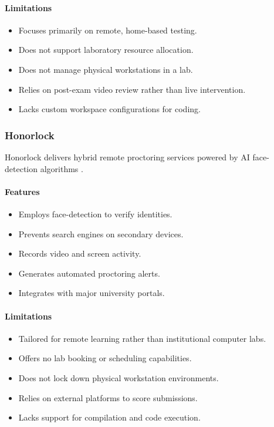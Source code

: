 \paragraph{Limitations}
\begin{itemize}[noitemsep]
\item Focuses primarily on remote, home-based testing.
\item Does not support laboratory resource allocation.
\item Does not manage physical workstations in a lab.
\item Relies on post-exam video review rather than live intervention.
\item Lacks custom workspace configurations for coding.
\end{itemize}

\subsubsection{Honorlock}
Honorlock delivers hybrid remote proctoring services powered by AI face-detection algorithms \cite{honorlock1}.

\paragraph{Features}
\begin{itemize}[noitemsep]
\item Employs face-detection to verify identities.
\item Prevents search engines on secondary devices.
\item Records video and screen activity.
\item Generates automated proctoring alerts.
\item Integrates with major university portals.
\end{itemize}

\paragraph{Limitations}
\begin{itemize}[noitemsep]
\item Tailored for remote learning rather than institutional computer labs.
\item Offers no lab booking or scheduling capabilities.
\item Does not lock down physical workstation environments.
\item Relies on external platforms to score submissions.
\item Lacks support for compilation and code execution.
\end{itemize}

